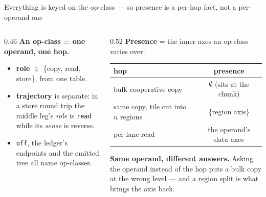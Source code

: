 \documentclass[aspectratio=169,9pt]{beamer}
\newcommand{\tsub}[1]{{\footnotesize\color{gray}#1}}
\newcommand{\key}[1]{\textcolor{acc}{\textbf{#1}}}
\newcommand{\bad}[1]{\textcolor{warn}{\textbf{#1}}}
\begin{document}
\begin{frame}{Everything is keyed on the op-class --- so presence is a per-hop fact, not a per-operand one}
\begin{center}
\end{center}
\vspace{2pt}
\begin{columns}[T]
\begin{column}{0.46\textwidth}
\textbf{An op-class = one operand, one hop.}
\begin{itemize}\itemsep1pt
\item \key{role} $\in$ \{copy, read, store\}, from one table.
\item \key{trajectory} is separate: in a store round trip the middle leg's \emph{role} is
      \texttt{read} while its \emph{sense} is reverse.
\item \texttt{off}, the ledger's endpoints and the emitted tree all name op-classes.
\end{itemize}
\end{column}
\begin{column}{0.52\textwidth}
\textbf{Presence} = the inner axes an op-class varies over.
\begin{center}\scriptsize
\begin{tabular}{@{}lc@{}}
\toprule
hop & presence \\
\midrule
bulk cooperative copy & $\emptyset$ \tsub{(sits at the chunk)} \\
same copy, tile cut into $n$ regions & \{region axis\} \\
per-lane read & the operand's data axes \\
\bottomrule
\end{tabular}
\end{center}
\vspace{2pt}
\bad{Same operand, different answers.} Asking the operand instead of the hop puts a bulk copy
at the wrong level --- and a region split is what brings the axis back.
\end{column}
\end{columns}
\end{frame}
\end{document}
